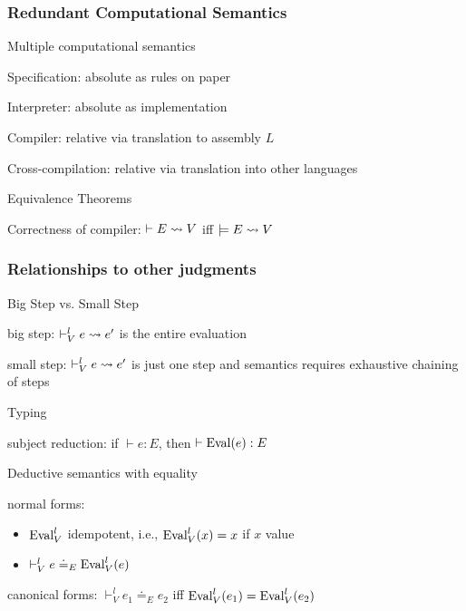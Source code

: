 \begin{frame}\frametitle{Redundant Computational Semantics}
\begin{blockitems}{Multiple computational semantics}
\item Specification: absolute as rules on paper
\item Interpreter: absolute as implementation
\item Compiler: relative via translation to assembly $L$
\item Cross-compilation: relative via translation into other languages
\end{blockitems}

\begin{blockitems}{Equivalence Theorems}
\item Correctness of compiler: $\vdash E\rightsquigarrow V$ iff $\models E\rightsquigarrow V$
\end{blockitems}
\end{frame}

\begin{frame}\frametitle{Relationships to other judgments}
\begin{blockitems}{Big Step vs. Small Step}
 \item big step: $\vdash^l_V e\rightsquigarrow e'$ is the entire evaluation
 \item small step: $\vdash^l_V e\rightsquigarrow e'$ is just one step and semantics requires exhaustive chaining of steps
\end{blockitems}

\begin{blockitems}{Typing}
 \item subject reduction: if $\vdash e:E$, then $\vdash \mathrm{Eval}(e):E$
\end{blockitems}

\begin{blockitems}{Deductive semantics with equality}
 \item normal forms:
  \begin{itemize}
  \item $\mathrm{Eval}^l_V$ idempotent, i.e., $\mathrm{Eval}^l_V(x)=x$ if $x$ value
  \item $\vdash^l_V e\doteq_E\mathrm{Eval}^l_V(e)$
  \end{itemize} 
 \item canonical forms: $\vdash^l_V e_1\doteq_E e_2$ iff $\mathrm{Eval}^l_V(e_1)=\mathrm{Eval}^l_V(e_2)$
\end{blockitems}
\end{frame}

